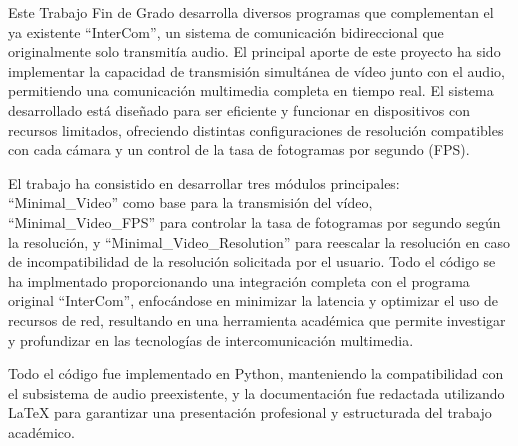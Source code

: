 \selectfont
\setlength{\parindent}{1.5em} %
\setlength{\parskip}{1.2em} %
\large

\begin{justify}
{\color{white}\noindent\hspace{1.5em}Este Trabajo Fin de Grado desarrolla diversos programas que complementan el ya existente ``InterCom'', un sistema de comunicación bidireccional que originalmente solo transmitía audio. El principal aporte de este proyecto ha sido implementar la capacidad de transmisión simultánea de vídeo junto con el audio, permitiendo una comunicación multimedia completa en tiempo real. El sistema desarrollado está diseñado para ser eficiente y funcionar en dispositivos con recursos limitados, ofreciendo distintas configuraciones de resolución compatibles con cada cámara y un control de la tasa de fotogramas por segundo (FPS).}

{\color{white}\noindent\hspace{1.5em}El trabajo ha consistido en desarrollar tres módulos principales: ``Minimal\_Video'' como base para la transmisión del vídeo, ``Minimal\_Video\_FPS'' para controlar la tasa de fotogramas por segundo según la resolución, y ``Minimal\_Video\_Resolution'' para reescalar la resolución en caso de incompatibilidad de la resolución solicitada por el usuario. Todo el código se ha implmentado proporcionando una integración completa con el programa original ``InterCom'', enfocándose en minimizar la latencia y optimizar el uso de recursos de red, resultando en una herramienta académica que permite investigar y profundizar en las tecnologías de intercomunicación multimedia.}

{\color{white}\noindent\hspace{1.5em}Todo el código fue implementado en Python, manteniendo la compatibilidad con el subsistema de audio preexistente, y la documentación fue redactada utilizando LaTeX para garantizar una presentación profesional y estructurada del trabajo académico.}
\end{justify}